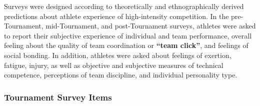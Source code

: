 Surveys were designed according to theoretically and ethnographically derived predictions about athlete experience of high-intensity competition.  In the pre-Tournament, mid-Tournament, and post-Tournament surveys, athletes were asked to report their subjective experience of individual and team performance, overall feeling about the quality of team coordination or \textbf{``team click''}, and feelings of social bonding.  In addition, athletes were asked about feelings of exertion, fatigue, injury, as well as objective and subjective measures of technical competence, perceptions of team discipline, and individual personality type.




  \subsubsection{\label{Section:Tournament Survey Items}Tournament Survey Items}



